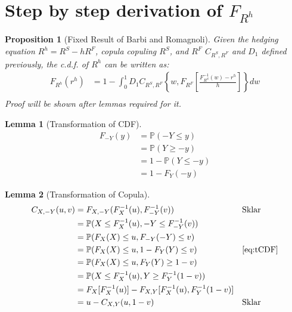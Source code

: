\documentclass[11pt, leqno]{article}
\newtheorem{prop}{Proposition}[section]
\newtheorem{lemma}{Lemma}[section]
\numberwithin{equation}{section}
\begin{document}
    \section{Step by step derivation of $F_{R^h}$}\label{sec:steps}
\begin{prop}[Fixed Result of Barbi and Romagnoli]\label{prop:BarbiRoma}
Given the hedging equation $R^h = R^S - hR^F$, copula copuling $R^S$, and $R^F$ $C_{R^S, R^F}$ and $D_1$ defined previously,
the c.d.f. of $R^h$ can be written as:
    \begin{align*}
        F_{R^h}(r^h)
        &= 1- \int^1_0 D_1 C_{R^S, R^F}
        \left\{
        w,
        F_{R^F}
        \left[
        \frac{F^{-1}_{R^S}(w)-r^h}{h}
        \right]
        \right\}dw \\
    \end{align*}
Proof will be shown after lemmas required for it.
\end{prop}
\begin{lemma}[Transformation of CDF]
    \begin{align}
        F_{-Y}(y)
        &= \mathbb{P}(-Y \leq y) \nonumber\\
        &= \mathbb{P}(Y \geq -y) \nonumber\\
        &= 1 - \mathbb{P}(Y \leq -y)\nonumber\\
        &= 1 - F_{Y}(-y)   \label{eq:tCDF}
    \end{align}
\end{lemma}
\begin{lemma}[Transformation of Copula]
    \begin{align}
        C_{X,-Y}(u,v) &=
        F_{X,-Y}(F_X^{-1}(u),F_{-Y}^{-1}(v)) &&\text{Sklar}\nonumber\\
        &=
        \mathbb{P}(X \leq F_X^{-1}(u), -Y \leq F_{-Y}^{-1}(v)) \nonumber\\
        &=
        \mathbb{P}(F_X(X) \leq u, F_{-Y}(-Y) \leq v) \nonumber\\
        &=
        \mathbb{P}(F_X(X) \leq u, 1-F_{Y}(Y) \leq v) && \text{\eqref{eq:tCDF}}\nonumber\\
        &=
        \mathbb{P}(F_X(X) \leq u, F_{Y}(Y) \geq 1-v) \nonumber\\
        &=
        \mathbb{P}(X \leq F_X^{-1}(u), Y \geq F_Y^{-1}(1-v)) \nonumber\\
        &=
        F_X[F_X^{-1}(u)] - F_{X,Y}[F_X^{-1}(u), F_Y^{-1}(1-v)] \nonumber\\
        &=
        u - C_{X,Y}(u, 1-v) &&\text{Sklar} \label{eq:trans-Copula}
    \end{align}
\end{lemma}
\end{document}
